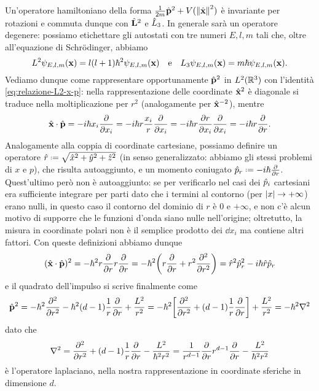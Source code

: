 Un'operatore hamiltoniano della forma $\frac1{2m}\hat{\mathbf{p}}^2+V(\left\|{\hat{\mathbf{x}}}\right\|^2)$ è invariante per rotazioni e commuta dunque con $\hat{\mathbf{L}}^2$ e $\hat{L}_3$.
In generale sarà un operatore degenere: possiamo etichettare gli autostati con tre numeri $E,l,m$ tali che, oltre all'equazione di Schr\"odinger, abbiamo
\begin{equation}
	L^2\psi_{E,l,m}(\mathbf{x})=l(l+1)\hbar^2\psi_{E,l,m}(\mathbf{x})\quad\text{e}\quad L_3\psi_{E,l,m}(\mathbf{x})=m\hbar\psi_{E,l,m}(\mathbf{x}).
	\label{eq:autofunzioni-momento-angolare}
\end{equation}
Vediamo dunque come rappresentare opportunamente $\hat{\mathbf{p}}^2$ in $L^2(\mathbb{R}^3)$ con l'identità \eqref{eq:relazione-L2-x-p}: nella rappresentazione delle coordinate $\hat{\mathbf{x}}^2$ è diagonale si traduce nella moltiplicazione per $r^2$ (analogamente per $\hat{\mathbf{x}}^{-2}$), mentre
\begin{equation}
	{\hat{\mathbf{x}}}\cdot{\hat{\mathbf{p}}}=-i\hbar x_i\frac{\partial {}}{\partial {x_i}}=-i\hbar r\frac{x_i}{r}\frac{\partial {}}{\partial {x_i}}=-i\hbar r\frac{\partial {r}}{\partial {x_i}}\frac{\partial {}}{\partial {x_i}}=-i\hbar r\frac{\partial {}}{\partial {r}}.
\end{equation}
Analogamente alla coppia di coordinate cartesiane, possiamo definire un operatore $\op r\defeq\sqrt{\op x^2+\op y^2+\op z^2}$ (in senso generalizzato: abbiamo gli stessi problemi di $x$ e $p$), che risulta autoaggiunto, e un momento coniugato $\op p_r\defeq-i\hbar\drp{}{r}$.
Quest'ultimo però non è autoaggiunto: se per verificarlo nel casi dei $\hat{p}_i$ cartesiani era sufficiente integrare per parti dato che i termini al contorno (per $\left|{x}\right|\to+\infty$) erano nulli, in questo caso il contorno del dominio di $r$ è $0$ e $+\infty$, e non c'è alcun motivo di supporre che le funzioni d'onda siano nulle nell'origine; oltretutto, la misura in coordinate polari non è il semplice prodotto dei $\dd x_i$ ma contiene altri fattori.
Con queste definizioni abbiamo dunque
\begin{equation}
	({\hat{\mathbf{x}}}\cdot{\hat{\mathbf{p}}})^2=-\hbar^2r\frac{\partial {}}{\partial {r}}r\frac{\partial {}}{\partial {r}}=-\hbar^2\bigg(r\frac{\partial {}}{\partial {r}}+r^2\frac{\partial^2 {}}{\partial {r}^2}\bigg)=\hat{r}^2\hat{p}_r^2-i\hbar \hat{r}\hat{p}_r
\end{equation}
e il quadrato dell'impulso si scrive finalmente come
\begin{equation}
	\hat{\mathbf{p}}^2=-\hbar^2\frac{\partial^2 {}}{\partial {r}^2}-\hbar^2(d-1)\frac1{r}\frac{\partial {}}{\partial {r}}+\frac{L^2}{r^2}=
	-\hbar^2\bigg[\frac{\partial^2 {}}{\partial {r}^2}+(d-1)\frac1{r}\frac{\partial {}}{\partial {r}}\bigg]+\frac{L^2}{r^2}=
	-\hbar^2\nabla^2
\end{equation}
dato che
\begin{equation}
	\nabla^2=\frac{\partial^2 {}}{\partial {r}^2}+(d-1)\frac1{r}\frac{\partial {}}{\partial {r}}-\frac{L^2}{\hbar^2r^2}=
	\frac1{r^{d-1}}\frac{\partial {}}{\partial {r}}r^{d-1}\frac{\partial {}}{\partial {r}}-\frac{L^2}{\hbar^2r^2}
	\label{eq:laplaciano-momento-angolare}
\end{equation}
è l'operatore laplaciano, nella nostra rappresentazione in coordinate sferiche in dimensione $d$.

